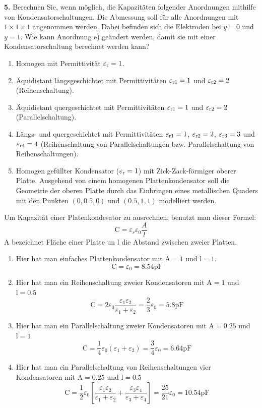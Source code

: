 \documentclass[Protokollheft.tex]{subfiles}
\begin{document}
\begin{framed}
	\noindent \textbf{5.} Berechnen Sie, wenn möglich, die Kapazitäten folgender Anordnungen mithilfe von Kondensatorschaltungen. Die Abmessung soll für alle Anordnungen mit $1\times1\times1$     
angenommen werden. Dabei befinden sich die Elektroden bei $y = 0$ und $y = 1$. Wie kann Anordnung e) geändert werden, damit sie mit einer Kondensatorschaltung berechnet werden kann?
\begin{enumerate}[label=\alph*)]
\item Homogen mit Permittivität $\varepsilon_\text{r}=1$.
\item Äquidistant längsgeschichtet mit Permittivitäten $\varepsilon_{\text{r}1}=1$ und $\varepsilon_{\text{r}2}=2$                    (Reihenschaltung).
\item Äquidistant quergeschichtet mit Permittivitäten $\varepsilon_{\text{r}1}=1$ und $\varepsilon_{\text{r}2}=2$                     (Parallelschaltung).
\item Längs- und quergeschichtet mit Permittivitäten $\varepsilon_{\text{r}1}=1$,                      
$\varepsilon_{\text{r}2}=2$, $\varepsilon_{\text{r}3}=3$ und $\varepsilon_{\text{r}4}=4$ (Reihenschaltung von Parallelschaltungen bzw. Parallelschaltung von Reihenschaltungen).
\item Homogen gefüllter Kondensator ($\varepsilon_\text{r}=1$) mit Zick-Zack-förmiger oberer Platte. Ausgehend von einem homogenen Plattenkondensator soll die Geometrie der oberen Platte durch das Einbringen eines metallischen Quaders mit den Punkten $(0,0.5,0)$ und $(0.5,1,1)$ modelliert werden.
\end{enumerate}
\label{exer:calcCapsAnalytical}
\end{framed}
Um Kapazität einer Platenkondesator zu ausrechnen, benutzt man dieser Formel:
$$\text{C}=\varepsilon_r\varepsilon_0\frac{A}{l} $$
$\text{A}$ bezeichnet Fläche einer Platte un $\text{l}$ die Abstand zwischen zweier Platten.

\begin{enumerate}[label=(\alph*)]
	\item Hier hat man  einfaches Plattenkondensator mit  $\text{A}=1$ und $\text{l}=1$.\\
	$$\text{C}=\varepsilon_0=8.54\mathrm{pF}$$
	\item Hier hat man ein Reihenschaltung zweier Kondensatoren mit $\text{A}=1$ und $\text{l}=0.5$ 
	$$\text{C}=2\varepsilon_0\frac{\varepsilon_1\varepsilon_2}{\varepsilon_1+\varepsilon_2}=\frac{2}{3}\varepsilon_0= 5.8\mathrm{pF}$$
	\item Hier hat man ein Parallelschaltung zweier Kondensatoren mit $\text{A}=0.25$ und $\text{l}=1$ 
	 $$\text{C}=\frac{1}{4}\varepsilon_0(\varepsilon_1+\varepsilon_2)=\frac{3}{4}\varepsilon_0=6.64\mathrm{pF}$$
	\item  Hier hat man ein Parallelschaltung von Reihenschaltungen vier Kondensatoren mit $\text{A}=0.25$ und $\text{l}=0.5$
	$$\text{C}=\frac{1}{2}\varepsilon_0\left[\frac{\varepsilon_1\varepsilon_2}{\varepsilon_1+\varepsilon_2}+\frac{\varepsilon_3\varepsilon_4}{\varepsilon_3+\varepsilon_4} \right]=\frac{25}{21}\varepsilon_0=10.54\mathrm{pF}$$
\end{enumerate}
\end{document}
